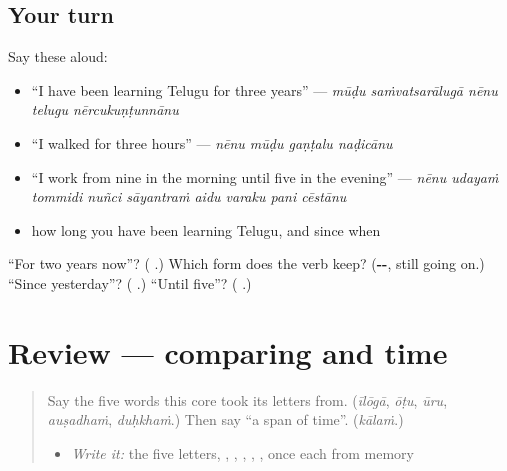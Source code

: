 \subsection*{Your turn}
Say these aloud:

\begin{itemize}
\raggedright
  \item \textquotedblleft{}I have been learning Telugu for three years\textquotedblright{} — \emph{mūḍu saṁvatsarālugā nēnu telugu nērcukuṇṭunnānu}
  \item \textquotedblleft{}I walked for three hours\textquotedblright{} — \emph{nēnu mūḍu gaṇṭalu naḍicānu}
  \item \textquotedblleft{}I work from nine in the morning until five in the evening\textquotedblright{} — \emph{nēnu udayaṁ tommidi nuñci sāyantraṁ aidu varaku pani cēstānu}
  \item how long you have been learning Telugu, and since when
\end{itemize}

\begin{tcolorbox}[breakable,colback=teal!4,colframe=teal!35!black,title={Before you move on}]
\textquotedblleft{}For two years now\textquotedblright{}? (\textbf{ }.) Which form does the verb keep? (\textbf{--}, still going on.) \textquotedblleft{}Since yesterday\textquotedblright{}? (\textbf{ }.) \textquotedblleft{}Until five\textquotedblright{}? (\textbf{ }.)
\end{tcolorbox}
\section[(review)]{Review — comparing and time}

\label{lesson:TE-R323-comparing-and-time}



\begin{quote}
Say the five words this core took its letters from. (\emph{īlōgā}, \emph{ōṭu}, \emph{ūru}, \emph{auṣadhaṁ}, \emph{duḥkhaṁ}.) Then say \textquotedblleft{}a span of time\textquotedblright{}. (\emph{kālaṁ}.)

\begin{itemize}
\raggedright
  \item \emph{Write it:} the five letters, \textbf{}, \textbf{}, \textbf{}, \textbf{}, \textbf{}, once each from memory
\end{itemize}
\end{quote}

